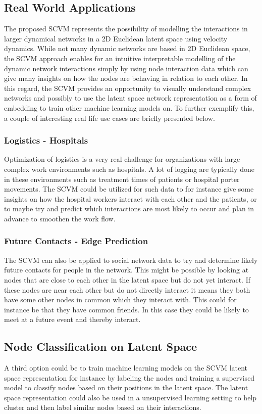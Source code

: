 \subsection{Real World Applications}
\label{sec:Discussion:UseCases}
The proposed SCVM represents the possibility of modelling the interactions in larger dynamical networks in a 2D Euclidean latent space using velocity dynamics. 
While not many dynamic networks are based in 2D Euclidean space, the SCVM approach enables for an intuitive interpretable modelling of the dynamic network interactions simply by using node interaction data which can give many insights on how the nodes are behaving in relation to each other.
In this regard, the SCVM provides an opportunity to visually understand complex networks and possibly to use the latent space network representation as a form of embedding to train other machine learning models on.
To further exemplify this, a couple of interesting real life use cases are briefly presented below.

\subsubsection{Logistics - Hospitals}
\label{sec:Discussion:UseCases:Hospitals}
Optimization of logistics is a very real challenge for organizations with large complex work environments such as hospitals. A lot of logging are typically done in these environments such as treatment times of patients or hospital porter movements. The SCVM could be utilized for such data to for instance give some insights on how the hospital workers interact with each other and the patients, or to maybe try and predict which interactions are most likely to occur and plan in advance to smoothen the work flow.

\subsubsection{Future Contacts - Edge Prediction}
\label{sec:Discussion:UseCases:Marketing}
The SCVM can also be applied to social network data to try and determine likely future contacts for people in the network. This might be possible by looking at nodes that are close to each other in the latent space but do not yet interact. If these nodes are near each other but do not directly interact it means they both have some other nodes in common which they interact with. This could for instance be that they have common friends. In this case they could be likely to meet at a future event and thereby interact.

\subsection{Node Classification on Latent Space}
A third option could be to train machine learning models on the SCVM latent space representation for instance by labeling the nodes and training a supervised model to classify nodes based on their positions in the latent space. The latent space representation could also be used in a unsupervised learning setting to help cluster and then label similar nodes based on their interactions.